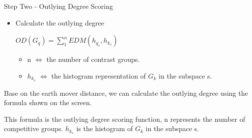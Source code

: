 \documentclass[
 size=14pt,
 paper=smartboard,  %
 mode=present, 		%
 display=slides, 	%
 style=tuliplab,  	%
 pauseslide,
 fleqn,leqno]{powerdot}
\begin{document}
\begin{slide}[toc=,bm=]{Step Two - Outlying Degree Scoring}

\begin{itemize}
\item
Calculate the outlying degree

\vspace{1.2cm}

\begin{centering}

$ OD(G_q) = \sum_{1}^{n}EDM(h_{q_s}, h_{k_s}) $

\end{centering}

\begin{itemize}
\item
n $\Leftrightarrow$ the number of contrast groups.

\item
$h_{k_s}$  $\Leftrightarrow$ the histogram representation of $G_k$ in the subspace s.

\end{itemize}
\end{itemize}

\begin{note}
Base on the earth mover distance,
we can calculate the outlying degree using the formula shown on the screen.

This formula is the outlying degree scoring function,
n represents the number of competitive groups.
$h_{k_s}$ is the histogram of $G_k$ in the subspace s.
\end{note}

\end{slide}
\end{document}
